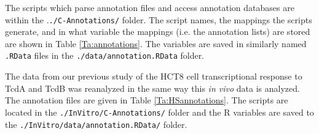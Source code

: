 The scripts which parse annotation files and access annotation databases
are within the .\texttt{./C-Annotations/} folder. The script names, 
the mappings the scripts generate, and in what variable the mappings (i.e. the
annotation lists) are stored 
are shown in Table \ref{Ta:annotations}. The variables are saved in
similarly named \texttt{.RData} files in the
\texttt{./data/annotation.RData} folder.

\begin{table}[h]
  \begin{center}
    \caption{Annotation scripts and variables. ``Affy''=Affymetrix
             Mouse 430 2.0 probeset ID. ``Entrez''=Entrez gene ID,
             ``Ensembl''=Ensembl gene ID}\label{Ta:annotations}
  \end{center}
\end{table}

The data from our previous study of the HCT8 cell transcriptional response 
to TcdA and TcdB was reanalyzed in the same way this \emph{in vivo} data is analyzed. 
The annotation files are given in Table \ref{Ta:HSannotations}. The scripts are located in the 
\texttt{./InVitro/C-Annotations/} folder and the R variables are saved to the
\texttt{./InVitro/data/annotation.RData/} folder.

